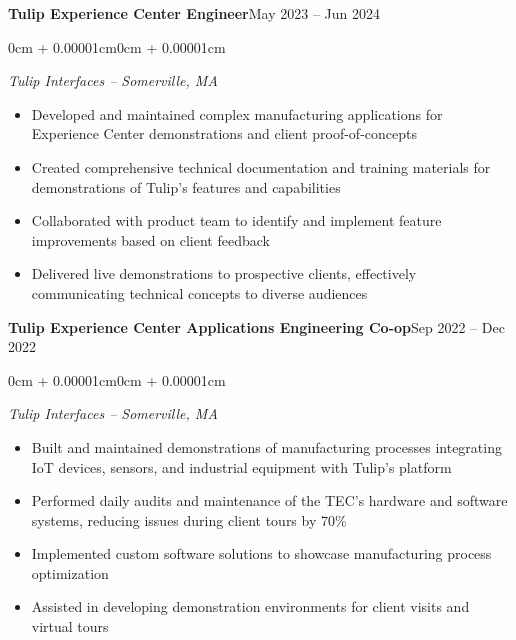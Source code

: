 \documentclass[10pt, letterpaper]{article}
\newenvironment{highlights}{
    \begin{itemize}[
        leftmargin=0.5cm,
        rightmargin=0cm,
        itemindent=0cm,
        labelwidth=0.3cm,
        labelsep=0.2cm,
        align=left,
        itemsep=0.05cm,
        topsep=0.05cm,
        parsep=0.05cm,
        partopsep=0pt
    ]
}{
    \end{itemize}
    \vspace{0.1cm}
}
\newenvironment{onecolentry}{
    \begin{adjustwidth}{0cm + 0.00001cm}{0cm + 0.00001cm}
}{
    \end{adjustwidth}
}
\begin{document}
    \begin{twocolentry}{\textbf{Tulip Experience Center Engineer}}{May 2023 -- Jun 2024}
    \end{twocolentry}
    \begin{onecolentry}
    \textit{Tulip Interfaces -- Somerville, MA}
    \begin{highlights}
        \item Developed and maintained complex manufacturing applications for Experience Center demonstrations and client proof-of-concepts
            \item Created comprehensive technical documentation and training materials for demonstrations of Tulip's features and capabilities
        \item Collaborated with product team to identify and implement feature improvements based on client feedback
        \item Delivered live demonstrations to prospective clients, effectively communicating technical concepts to diverse audiences
    \end{highlights}
    \end{onecolentry}

    \begin{twocolentry}{\textbf{Tulip Experience Center Applications Engineering Co-op}}{Sep 2022 -- Dec 2022}
    \end{twocolentry}
    \begin{onecolentry}
    \textit{Tulip Interfaces -- Somerville, MA}
    \begin{highlights}
            \item Built and maintained demonstrations of manufacturing processes integrating IoT devices, sensors, and industrial equipment with Tulip's platform
        \item Performed daily audits and maintenance of the TEC's hardware and software systems, reducing issues during client tours by 70\%
        \item Implemented custom software solutions to showcase manufacturing process optimization
        \item Assisted in developing demonstration environments for client visits and virtual tours
    \end{highlights}
    \end{onecolentry}
\end{document}
